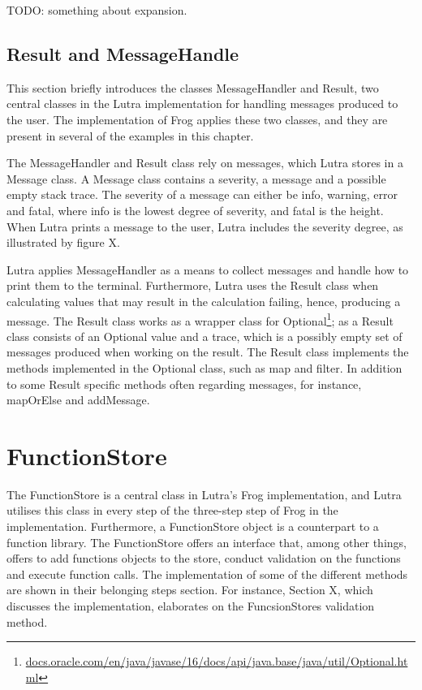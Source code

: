 \para
TODO: something about expansion. 

\subsection{Result and MessageHandle}
This section briefly introduces the classes MessageHandler and Result, two central classes in the Lutra implementation for handling messages produced to the user. The implementation of Frog applies these two classes, and they are present in several of the examples in this chapter. 

\para
The MessageHandler and Result class rely on messages, which Lutra stores in a Message class. A Message class contains a severity, a message and a possible empty stack trace. The severity of a message can either be info, warning, error and fatal, where info is the lowest degree of severity, and fatal is the height. When Lutra prints a message to the user, Lutra includes the severity degree, as illustrated by figure X.  

\para
Lutra applies MessageHandler as a means to collect messages and handle how to print them to the terminal. Furthermore,  Lutra uses the Result class when calculating values that may result in the calculation failing, hence, producing a message. The Result class works as a wrapper class for Optional\footnote{\url{docs.oracle.com/en/java/javase/16/docs/api/java.base/java/util/Optional.html}}; as a Result class consists of an Optional value and a trace, which is a possibly empty set of messages produced when working on the result. The Result class implements the methods implemented in the Optional class, such as map and filter. In addition to some Result specific methods often regarding messages, for instance, mapOrElse and addMessage.

\section{FunctionStore}
The FunctionStore is a central class in Lutra's Frog implementation, and Lutra utilises this class in every step of the three-step step of Frog in the implementation. Furthermore, a FunctionStore object is a counterpart to a function library. The FunctionStore offers an interface that, among other things, offers to add functions objects to the store, conduct validation on the functions and execute function calls. The implementation of some of the different methods are shown in their belonging steps section. For instance, Section X, which discusses the implementation, elaborates on the  FuncsionStores validation method. 

